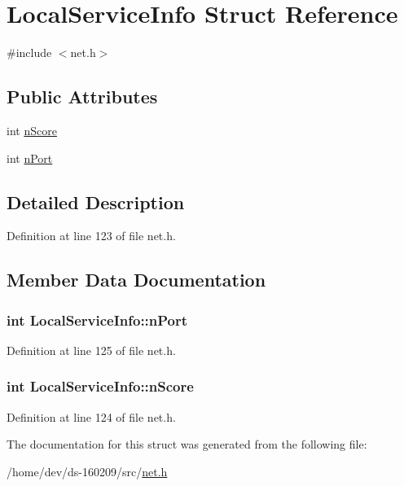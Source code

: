 \hypertarget{struct_local_service_info}{}\section{Local\+Service\+Info Struct Reference}
\label{struct_local_service_info}


{\ttfamily \#include $<$net.\+h$>$}

\subsection*{Public Attributes}
\begin{DoxyCompactItemize}
\item 
int \hyperlink{struct_local_service_info_ad6a9d404fb109ba1506df3f6ca842ed5}{n\+Score}
\item 
int \hyperlink{struct_local_service_info_aa5c39fec8cc69a43e393bb158f69224b}{n\+Port}
\end{DoxyCompactItemize}


\subsection{Detailed Description}


Definition at line 123 of file net.\+h.



\subsection{Member Data Documentation}
\hypertarget{struct_local_service_info_aa5c39fec8cc69a43e393bb158f69224b}{}
\subsubsection[{n\+Port}]{\setlength{\rightskip}{0pt plus 5cm}int Local\+Service\+Info\+::n\+Port}\label{struct_local_service_info_aa5c39fec8cc69a43e393bb158f69224b}


Definition at line 125 of file net.\+h.

\hypertarget{struct_local_service_info_ad6a9d404fb109ba1506df3f6ca842ed5}{}
\subsubsection[{n\+Score}]{\setlength{\rightskip}{0pt plus 5cm}int Local\+Service\+Info\+::n\+Score}\label{struct_local_service_info_ad6a9d404fb109ba1506df3f6ca842ed5}


Definition at line 124 of file net.\+h.



The documentation for this struct was generated from the following file\+:\begin{DoxyCompactItemize}
\item 
/home/dev/ds-\/160209/src/\hyperlink{net_8h}{net.\+h}\end{DoxyCompactItemize}

